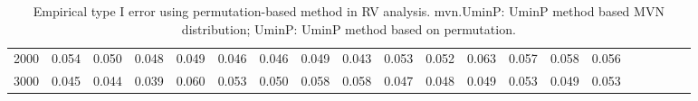 \documentclass[12pt]{article}
\begin{document}
\begin{itemize}
\begin{table}[ht]
{\begin{minipage}{\textwidth}
\begin{tabular}{rrrrrrrrrrrrrrrrrrrr}
2000 & 0.054 & 0.050 & 0.048 & 0.049 & 0.046  & 0.046 & 0.049 & 0.043 & 0.053 & 0.052  & 0.063 & 0.057 & 0.058 & 0.056  \\

3000 & 0.045 & 0.044 & 0.039 & 0.060 & 0.053  & 0.050 & 0.058 & 0.058 & 0.047 & 0.048  & 0.049 & 0.053 & 0.049 & 0.053  \\

  \hline
\end{tabular}
\caption{Empirical type I error using permutation-based method in RV analysis. mvn.UminP: UminP method based MVN distribution; UminP: UminP method based on permutation.  \label{table:Empirical type I error using permutation-based method in RV analysis}}
\end{minipage}}
\end{table}






\end{itemize}
\end{document}

